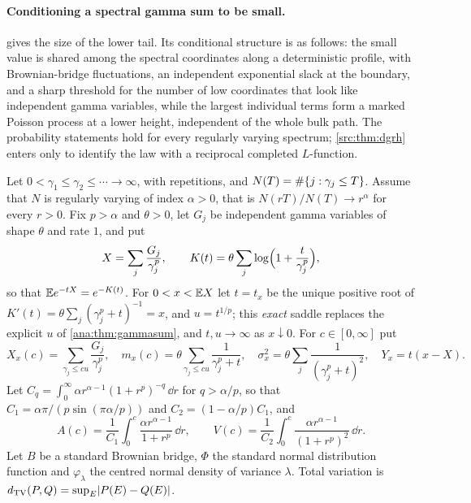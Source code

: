 \paragraph{Conditioning a spectral gamma sum to be small.}
 gives the size of the lower tail. Its conditional structure is as
follows: the small value is shared among the spectral coordinates along a deterministic profile,
with Brownian-bridge fluctuations, an independent exponential slack at the boundary, and a sharp
threshold for the number of low coordinates that look like independent gamma variables, while the
largest individual terms form a marked Poisson process at a lower height, independent of the whole
bulk path. The
probability statements hold for every regularly varying spectrum; \cref{src:thm:dgrh} enters only
to identify the law with a reciprocal completed $L$-function.

Let $0<\gamma_1\le\gamma_2\le\cdots\to\infty$, with repetitions, and $N(T)=\#\{j:\gamma_j\le T\}$.
Assume that $N$ is regularly varying of index $\alpha>0$, that is $N(rT)/N(T)\to r^\alpha$ for every
$r>0$. Fix $p>\alpha$ and $\theta>0$, let $G_j$ be independent gamma variables of shape $\theta$ and
rate $1$, and put
\[
 X=\sum_j\frac{G_j}{\gamma_j^p},\qquad K(t)=\theta\sum_j\log\Bigl(1+\frac t{\gamma_j^p}\Bigr),
\]
so that $\mathbb{E} e^{-tX}=e^{-K(t)}$. For $0<x<\mathbb{E} X$ let $t=t_x$ be the unique positive root of
$K'(t)=\theta\sum_j(\gamma_j^p+t)^{-1}=x$, and $u=t^{1/p}$; this \emph{exact} saddle replaces the
explicit $u$ of \cref{ana:thm:gammasum}, and $t,u\to\infty$ as $x\downarrow0$. For $c\in[0,\infty]$
put
\[
 X_x(c)=\sum_{\gamma_j\le cu}\frac{G_j}{\gamma_j^p},\quad
 m_x(c)=\theta\sum_{\gamma_j\le cu}\frac1{\gamma_j^p+t},\quad
 \sigma_x^2=\theta\sum_j\frac1{(\gamma_j^p+t)^2},\quad Y_x=t(x-X).
\]
Let $C_q=\int_0^\infty\alpha r^{\alpha-1}(1+r^p)^{-q}\,\dd r$ for $q>\alpha/p$, so that
$C_1=\alpha\pi/(p\sin(\pi\alpha/p))$ and $C_2=(1-\alpha/p)C_1$, and
\[
 A(c)=\frac1{C_1}\int_0^c\frac{\alpha r^{\alpha-1}}{1+r^p}\,\dd r,\qquad
 V(c)=\frac1{C_2}\int_0^c\frac{\alpha r^{\alpha-1}}{(1+r^p)^2}\,\dd r .
\]
Let $B$ be a standard Brownian bridge, $\Phi$ the standard normal distribution function and
$\varphi_\lambda$ the centred normal density of variance $\lambda$. Total variation is
$d_{\mathrm{TV}}(P,Q)=\sup_E\lvert P(E)-Q(E)\rvert$.

